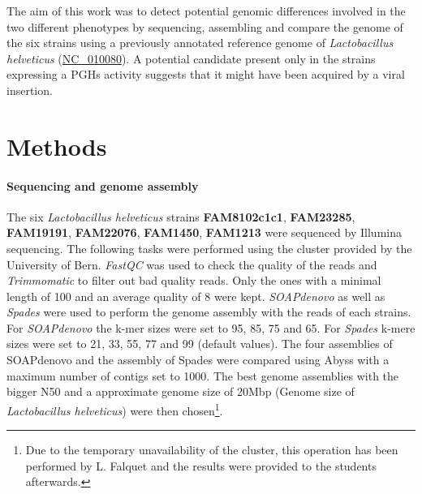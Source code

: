 \documentclass[10pt,a4paper]{article}
\begin{document}
\noindent The aim of this work was to detect potential genomic differences involved in the two different phenotypes by sequencing, assembling and compare the genome of the six strains using a previously annotated reference genome of \textit{Lactobacillus helveticus} (\href{https://www.ncbi.nlm.nih.gov/genome/?term=NC_010080}{NC\_010080}). A potential candidate present only in the strains expressing a PGHs activity suggests that it might have been acquired by a viral insertion. 

  


\section*{Methods}

\paragraph{Sequencing and genome assembly}
The six \textit{Lactobacillus helveticus} strains \textbf{FAM8102c1c1}, \textbf{FAM23285}, \textbf{FAM19191}, \textbf{FAM22076}, \textbf{FAM1450}, \textbf{FAM1213}  were sequenced by Illumina sequencing. The following tasks were performed using the cluster provided by the University of Bern.  \textit{FastQC}\cite{andrews2012} was used to check the quality of the reads and \textit{Trimmomatic}\cite{bolger_trimmomatic:_2014} to filter out bad quality reads. Only the ones with a minimal length of 100 and an average quality of 8 were kept. \textit{SOAPdenovo} as well as \textit{Spades} were used to perform the genome assembly with the reads of each strains. For \textit{SOAPdenovo} the k-mer sizes were set to 95, 85, 75 and 65. For \textit{Spades} k-mere sizes were set to 21, 33, 55, 77 and 99 (default values). The four assemblies of SOAPdenovo and the assembly of Spades were compared using Abyss with a maximum number of contigs set to 1000. The best genome assemblies with the bigger N50 and a approximate genome size of 20Mbp (Genome size of \textit{Lactobacillus helveticus}) were then chosen\footnote{Due to the temporary unavailability of the cluster, this operation has been performed by L. Falquet and the results were provided to the students afterwards.}.
\end{document}
